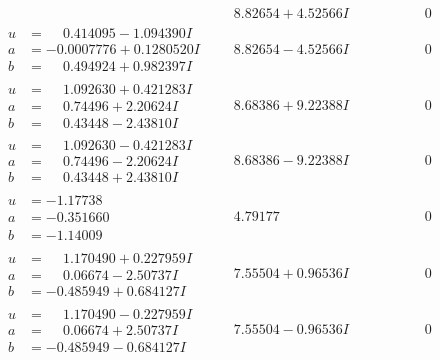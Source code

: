 \documentclass[1p]{elsarticle_modified}
\theoremstyle{definition}
\begin{document}
$$\begin{array}{c|c|c}
 & \phantom{-}8.82654 + 4.52566 I & \phantom{-0.000000 } 0 \\ \hline\begin{aligned}
u &= \phantom{-}0.414095 - 1.094390 I \\
a &= -0.0007776 + 0.1280520 I \\
b &= \phantom{-}0.494924 + 0.982397 I\end{aligned}
 & \phantom{-}8.82654 - 4.52566 I & \phantom{-0.000000 } 0 \\ \hline\begin{aligned}
u &= \phantom{-}1.092630 + 0.421283 I \\
a &= \phantom{-}0.74496 + 2.20624 I \\
b &= \phantom{-}0.43448 - 2.43810 I\end{aligned}
 & \phantom{-}8.68386 + 9.22388 I & \phantom{-0.000000 } 0 \\ \hline\begin{aligned}
u &= \phantom{-}1.092630 - 0.421283 I \\
a &= \phantom{-}0.74496 - 2.20624 I \\
b &= \phantom{-}0.43448 + 2.43810 I\end{aligned}
 & \phantom{-}8.68386 - 9.22388 I & \phantom{-0.000000 } 0 \\ \hline\begin{aligned}
u &= -1.17738\phantom{ +0.000000I} \\
a &= -0.351660\phantom{ +0.000000I} \\
b &= -1.14009\phantom{ +0.000000I}\end{aligned}
 & \phantom{-}4.79177\phantom{ +0.000000I} & \phantom{-0.000000 } 0 \\ \hline\begin{aligned}
u &= \phantom{-}1.170490 + 0.227959 I \\
a &= \phantom{-}0.06674 - 2.50737 I \\
b &= -0.485949 + 0.684127 I\end{aligned}
 & \phantom{-}7.55504 + 0.96536 I & \phantom{-0.000000 } 0 \\ \hline\begin{aligned}
u &= \phantom{-}1.170490 - 0.227959 I \\
a &= \phantom{-}0.06674 + 2.50737 I \\
b &= -0.485949 - 0.684127 I\end{aligned}
 & \phantom{-}7.55504 - 0.96536 I & \phantom{-0.000000 } 0 \\ \hline\begin{aligned}

\end{aligned}
\end{array}$$
\end{document}
